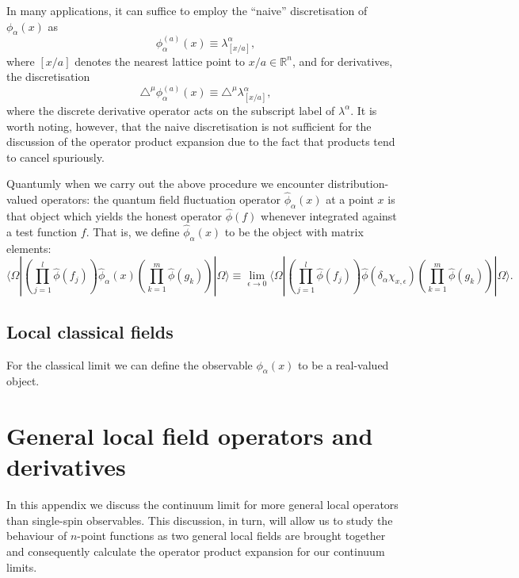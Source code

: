 \documentclass[prl,twocolumn,lengthcheck,superscriptaddress]{revtex4-1}
\theoremstyle{definition}
\theoremstyle{remark}
\begin{document}
In many applications, it can suffice to employ the ``naive'' discretisation of $\phi_\alpha(x)$ as
\begin{equation}
	\phi_\alpha^{(a)}(x) \equiv \lambda_{[x/a]}^\alpha,
\end{equation}
where $[x/a]$ denotes the nearest lattice point to $x/a\in \mathbb{R}^n$, and for derivatives, the discretisation
\begin{equation}
	\triangle^\mu \phi_\alpha^{(a)}(x) \equiv \triangle^\mu \lambda_{[x/a]}^\alpha,
\end{equation} 
where the discrete derivative operator acts on the subscript label of $\lambda^\alpha$. It is worth noting, however, that the naive discretisation is not sufficient for the discussion of the operator product expansion due to the fact that products tend to cancel spuriously. 

Quantumly when we carry out the above procedure we encounter distribution-valued operators: the quantum field fluctuation operator $\widehat{\phi}_{\alpha}(x)$ at a point $x$ is that object which yields the honest operator $\widehat{\phi}(f)$ whenever integrated against a test function $f$. That is, we define $\widehat{\phi}_{\alpha}(x)$ to be the object with matrix elements:
\begin{equation}\label{eq:qsctslimit}
	\langle\Omega|\left(\prod_{j=1}^l\widehat{\phi}(f_j)\right)\widehat{\phi}_\alpha(x)\left(\prod_{k=1}^m\widehat{\phi}(g_k)\right)|\Omega\rangle \equiv \lim_{\epsilon\rightarrow 0}\langle\Omega|\left(\prod_{j=1}^l\widehat{\phi}(f_j)\right)\widehat{\phi}(\delta_{\alpha}\chi_{x,\epsilon})\left(\prod_{k=1}^m\widehat{\phi}(g_k)\right)|\Omega\rangle.
\end{equation}

\subsection{Local classical fields}
For the classical limit we can define the observable $\phi_\alpha(x)$ to be a real-valued object.


\section{General local field operators and derivatives}
In this appendix we discuss the continuum limit for more general local operators than single-spin observables. This discussion, in turn, will allow us to study the behaviour of $n$-point functions as two general local fields are brought together and consequently calculate the operator product expansion for our continuum limits. 
\end{document}

